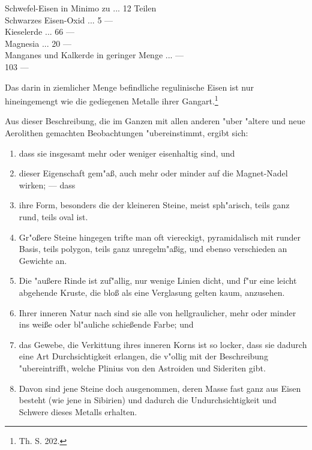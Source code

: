 \documentclass[a4paper, 11pt, oneside, polutonikogreek, german]{article}
\begin{document}
Schwefel-Eisen in Minimo zu ... 12 Teilen\\
\hspace*{0.5cm} Schwarzes Eisen-Oxid ... 5 ---\\
\hspace*{0.5cm} Kieselerde ... 66 ---\\
\hspace*{0.5cm} Magnesia ... 20 ---\\
\hspace*{0.5cm} Manganes und Kalkerde in geringer Menge ... ---\\
\hspace*{2.5cm} 103 ---

Das darin in ziemlicher Menge befindliche regulinische Eisen ist nur hineingemengt wie die gediegenen Metalle ihrer Gangart.\footnote{ Th. S. 202.}

Aus dieser Beschreibung, die im Ganzen mit allen anderen "uber "altere und neue Aerolithen gemachten Beobachtungen "ubereinstimmt, ergibt sich:
\begin{enumerate}
    \item dass sie insgesamt mehr oder weniger eisenhaltig sind, und
    \item dieser Eigenschaft gem"aß, auch mehr oder minder auf die Magnet-Nadel wirken; --- dass
    \item ihre Form, besonders die der kleineren Steine, meist sph"arisch, teils ganz rund, teils oval ist.
    \item Gr"oßere Steine hingegen trifte man oft viereckigt, pyramidalisch mit runder Basis, teils polygon, teils ganz unregelm"aßig, und ebenso verschieden an Gewichte an.
    \item Die "außere Rinde ist zuf"allig, nur wenige Linien dicht, und f"ur eine leicht abgehende Kruste, die bloß als eine Verglasung gelten kaum, anzusehen.
    \item Ihrer inneren Natur nach sind sie alle von hellgraulicher, mehr oder minder ins weiße oder bl"auliche schießende Farbe; und
    \item das Gewebe, die Verkittung ihres inneren Korns ist so locker, dass sie dadurch eine Art Durchsichtigkeit erlangen, die v"ollig mit der Beschreibung "ubereintrifft, welche Plinius von den Astroiden und Sideriten gibt.
    \item Davon sind jene Steine doch ausgenommen, deren Masse fast ganz aus Eisen besteht (wie jene in Sibirien) und dadurch die Undurchsichtigkeit und Schwere dieses Metalls erhalten.
\end{enumerate}
\end{document}
